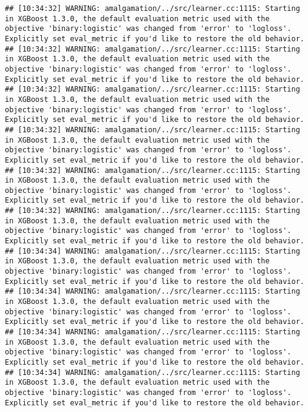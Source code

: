 \documentclass[
]{scrbook}
\begin{document}
\begin{verbatim}
## [10:34:32] WARNING: amalgamation/../src/learner.cc:1115: Starting in XGBoost 1.3.0, the default evaluation metric used with the objective 'binary:logistic' was changed from 'error' to 'logloss'. Explicitly set eval_metric if you'd like to restore the old behavior.
## [10:34:32] WARNING: amalgamation/../src/learner.cc:1115: Starting in XGBoost 1.3.0, the default evaluation metric used with the objective 'binary:logistic' was changed from 'error' to 'logloss'. Explicitly set eval_metric if you'd like to restore the old behavior.
## [10:34:32] WARNING: amalgamation/../src/learner.cc:1115: Starting in XGBoost 1.3.0, the default evaluation metric used with the objective 'binary:logistic' was changed from 'error' to 'logloss'. Explicitly set eval_metric if you'd like to restore the old behavior.
## [10:34:32] WARNING: amalgamation/../src/learner.cc:1115: Starting in XGBoost 1.3.0, the default evaluation metric used with the objective 'binary:logistic' was changed from 'error' to 'logloss'. Explicitly set eval_metric if you'd like to restore the old behavior.
## [10:34:32] WARNING: amalgamation/../src/learner.cc:1115: Starting in XGBoost 1.3.0, the default evaluation metric used with the objective 'binary:logistic' was changed from 'error' to 'logloss'. Explicitly set eval_metric if you'd like to restore the old behavior.
## [10:34:32] WARNING: amalgamation/../src/learner.cc:1115: Starting in XGBoost 1.3.0, the default evaluation metric used with the objective 'binary:logistic' was changed from 'error' to 'logloss'. Explicitly set eval_metric if you'd like to restore the old behavior.
## [10:34:34] WARNING: amalgamation/../src/learner.cc:1115: Starting in XGBoost 1.3.0, the default evaluation metric used with the objective 'binary:logistic' was changed from 'error' to 'logloss'. Explicitly set eval_metric if you'd like to restore the old behavior.
## [10:34:34] WARNING: amalgamation/../src/learner.cc:1115: Starting in XGBoost 1.3.0, the default evaluation metric used with the objective 'binary:logistic' was changed from 'error' to 'logloss'. Explicitly set eval_metric if you'd like to restore the old behavior.
## [10:34:34] WARNING: amalgamation/../src/learner.cc:1115: Starting in XGBoost 1.3.0, the default evaluation metric used with the objective 'binary:logistic' was changed from 'error' to 'logloss'. Explicitly set eval_metric if you'd like to restore the old behavior.
## [10:34:34] WARNING: amalgamation/../src/learner.cc:1115: Starting in XGBoost 1.3.0, the default evaluation metric used with the objective 'binary:logistic' was changed from 'error' to 'logloss'. Explicitly set eval_metric if you'd like to restore the old behavior.

\end{verbatim}
\end{document}
